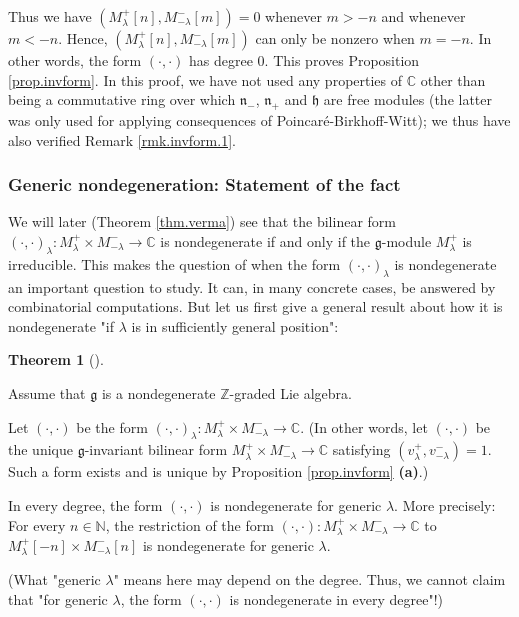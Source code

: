 \documentclass
[numbers=enddot,12pt,final,onecolumn,german,notitlepage]{scrartcl}%
\theoremstyle{definition}
\newtheorem{theo}{Theorem}
\newenvironment{theorem}[1][]
{\begin{theo}[#1]\begin{leftbar}}
{\end{leftbar}\end{theo}}
\begin{document}
Thus we have $\left(  M_{\lambda}^{+}\left[  n\right]  ,M_{-\lambda}%
^{-}\left[  m\right]  \right)  =0$ whenever $m>-n$ and whenever $m<-n$. Hence,
$\left(  M_{\lambda}^{+}\left[  n\right]  ,M_{-\lambda}^{-}\left[  m\right]
\right)  $ can only be nonzero when $m=-n$. In other words, the form $\left(
\cdot,\cdot\right)  $ has degree $0$. This proves Proposition
\ref{prop.invform}. In this proof, we have not used any properties of
$\mathbb{C}$ other than being a commutative ring over which $\mathfrak{n}_{-}%
$, $\mathfrak{n}_{+}$ and $\mathfrak{h}$ are free modules (the latter was only
used for applying consequences of Poincar\'{e}-Birkhoff-Witt); we thus have
also verified Remark \ref{rmk.invform.1}.

\subsubsection{Generic nondegeneration: Statement of the fact}

We will later (Theorem \ref{thm.verma}) see that the bilinear form $\left(
\cdot,\cdot\right)  _{\lambda}:M_{\lambda}^{+}\times M_{-\lambda}%
^{-}\rightarrow\mathbb{C}$ is nondegenerate if and only if the $\mathfrak{g}%
$-module $M_{\lambda}^{+}$ is irreducible. This makes the question of when the
form $\left(  \cdot,\cdot\right)  _{\lambda}$ is nondegenerate an important
question to study. It can, in many concrete cases, be answered by
combinatorial computations. But let us first give a general result about how
it is nondegenerate "if $\lambda$ is in sufficiently general position":

\begin{theorem}
\label{thm.invformnondeg}Assume that $\mathfrak{g}$ is a nondegenerate
$\mathbb{Z}$-graded Lie algebra.

Let $\left(  \cdot,\cdot\right)  $ be the form $\left(  \cdot,\cdot\right)
_{\lambda}:M_{\lambda}^{+}\times M_{-\lambda}^{-}\rightarrow\mathbb{C}$. (In
other words, let $\left(  \cdot,\cdot\right)  $ be the unique $\mathfrak{g}%
$-invariant bilinear form $M_{\lambda}^{+}\times M_{-\lambda}^{-}%
\rightarrow\mathbb{C}$ satisfying $\left(  v_{\lambda}^{+},v_{-\lambda}%
^{-}\right)  =1$. Such a form exists and is unique by Proposition
\ref{prop.invform} \textbf{(a)}.)

In every degree, the form $\left(  \cdot,\cdot\right)  $ is nondegenerate for
generic $\lambda$. More precisely: For every $n\in\mathbb{N}$, the restriction
of the form $\left(  \cdot,\cdot\right)  :M_{\lambda}^{+}\times M_{-\lambda
}^{-}\rightarrow\mathbb{C}$ to $M_{\lambda}^{+}\left[  -n\right]  \times
M_{-\lambda}^{-}\left[  n\right]  $ is nondegenerate for generic $\lambda$.

(What "generic $\lambda$" means here may depend on the degree. Thus, we cannot
claim that "for generic $\lambda$, the form $\left(  \cdot,\cdot\right)  $ is
nondegenerate in every degree"!)
\end{theorem}
\end{document}
